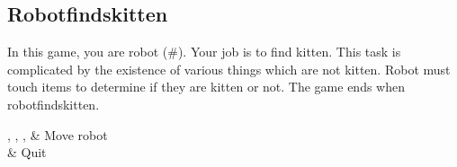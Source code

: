 \subsection{Robotfindskitten}
In this game, you are robot (\#). Your job is to find kitten. This task
is complicated by the existence of various things which are not kitten.
Robot must touch items to determine if they are kitten or not. The game
ends when robotfindskitten.

\begin{btnmap}
    \PluginUp, \PluginDown, \PluginLeft, \PluginRight
    & Move robot\\

    & Quit\\
\end{btnmap}
